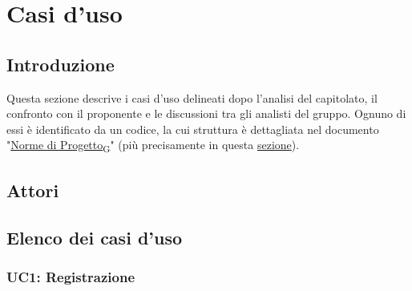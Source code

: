 \section{Casi d'uso}
\subsection{Introduzione}
Questa sezione descrive i casi d'uso delineati dopo l'analisi del capitolato, il confronto con il proponente e le discussioni tra gli analisti del gruppo. Ognuno di essi è identificato da un codice, la cui struttura è dettagliata nel documento "\href{https://7last.github.io/docs/rtb/documentazione-interna/glossario#norme-di-progetto}{Norme di Progetto\textsubscript{G}}" (più precisamente in questa \href{www.google.com}{sezione}).

\subsection{Attori}

\subsection{Elenco dei casi d'uso}
\subsubsection{UC1: Registrazione}

